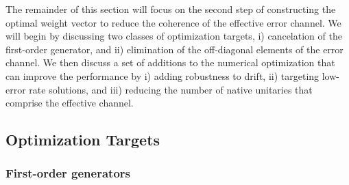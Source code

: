 \documentclass[aps,nofootinbib,pra,notitlepage,twocolumn]{revtex4-1}
\begin{document}
The remainder of this section will focus on the second step of constructing the optimal weight vector to reduce the coherence of the effective error channel. We will begin by discussing two classes of optimization targets, i) cancelation of the first-order generator, and ii) elimination of the off-diagonal elements of the error channel. We then discuss a set of additions to the numerical optimization that can improve the performance by i) adding robustness to drift,  ii) targeting low-error rate solutions, and iii) reducing the number of native unitaries that comprise the effective channel. 


\subsection{Optimization Targets}
\subsubsection{First-order generators} %
\label{sub:first_order_generators}
\end{document}
